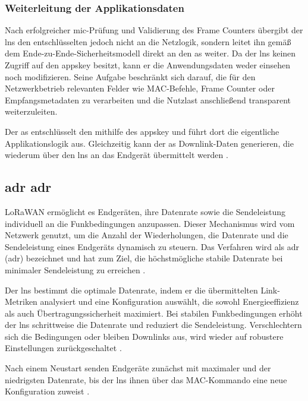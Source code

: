 \subsubsection{Weiterleitung der Applikationsdaten}
	Nach erfolgreicher \ac{mic}-Prüfung und Validierung des Frame Counters übergibt der \ac{lns} den entschlüsselten  jedoch nicht an die Netzlogik, sondern leitet ihn gemä{\ss} dem Ende-zu-Ende-Sicherheitsmodell direkt an den \ac{as} weiter. Da der \ac{lns} keinen Zugriff auf den \ac{appskey} besitzt, kann er die Anwendungsdaten weder einsehen noch modifizieren. Seine Aufgabe beschränkt sich darauf, die für den Netzwerkbetrieb relevanten Felder wie MAC-Befehle, Frame Counter oder Empfangsmetadaten zu verarbeiten und die Nutzlast anschlie{\ss}end transparent weiterzuleiten.

	Der \ac{as} entschlüsselt den   mithilfe des \ac{appskey} und führt dort die eigentliche Applikationslogik aus. Gleichzeitig kann der \ac{as} Downlink-Daten generieren, die wiederum über den \ac{lns} an das Endgerät übermittelt werden  \cite{Montagny:2022} \cite{LoRaAlliance:2020b} \cite{LoRaAlliance:2020c}.


\subsection{\acl{adr} \acs{adr}}
	LoRaWAN ermöglicht es Endgeräten, ihre Datenrate sowie die Sendeleistung individuell an die Funkbedingungen anzupassen. Dieser Mechanismus wird vom Netzwerk genutzt, um die Anzahl der Wiederholungen, die Datenrate und die Sendeleistung eines Endgeräts dynamisch zu steuern. Das Verfahren wird als \acl{adr} (\acs{adr}) bezeichnet und hat zum Ziel, die höchstmögliche stabile Datenrate bei minimaler Sendeleistung zu erreichen \cite{LoRaAlliance:2020b, Montagny:2022}.
	
	Der \ac{lns} bestimmt die optimale Datenrate, indem er die übermittelten Link-Metriken analysiert und eine Konfiguration auswählt, die sowohl Energieeffizienz als auch Übertragungssicherheit maximiert. Bei stabilen Funkbedingungen erhöht der \ac{lns} schrittweise die Datenrate und reduziert die Sendeleistung. Verschlechtern sich die Bedingungen oder bleiben Downlinks aus, wird wieder auf robustere Einstellungen zurückgeschaltet \cite{Montagny:2022, LoRaAlliance:2020b}. 
	
	Nach einem Neustart senden Endgeräte zunächst mit maximaler  und der niedrigsten Datenrate, bis der \ac{lns} ihnen über das MAC-Kommando  eine neue Konfiguration zuweist \cite{LoRaAlliance:2020b}. 

